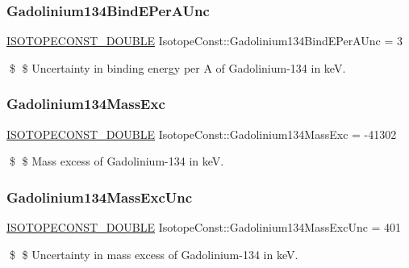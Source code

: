 \subsubsection{\texorpdfstring{Gadolinium134\+Bind\+E\+Per\+A\+Unc}{Gadolinium134BindEPerAUnc}}
{\footnotesize\ttfamily \mbox{\hyperlink{group___isotope_const-_macros_ga8f45a7272ce02c0b4c65c44636ed719a}{I\+S\+O\+T\+O\+P\+E\+C\+O\+N\+S\+T\+\_\+\+D\+O\+U\+B\+LE}} Isotope\+Const\+::\+Gadolinium134\+Bind\+E\+Per\+A\+Unc = 3}

\$ \$ Uncertainty in binding energy per A of Gadolinium-\/134 in keV. \mbox{\label{group___isotope_const-_gadolinium-_gd134_ga61730ce7c763df1f5a186f3af18690cd}} 
\subsubsection{\texorpdfstring{Gadolinium134\+Mass\+Exc}{Gadolinium134MassExc}}
{\footnotesize\ttfamily \mbox{\hyperlink{group___isotope_const-_macros_ga8f45a7272ce02c0b4c65c44636ed719a}{I\+S\+O\+T\+O\+P\+E\+C\+O\+N\+S\+T\+\_\+\+D\+O\+U\+B\+LE}} Isotope\+Const\+::\+Gadolinium134\+Mass\+Exc = -\/41302}

\$ \$ Mass excess of Gadolinium-\/134 in keV. \mbox{\label{group___isotope_const-_gadolinium-_gd134_ga2efe97db2ab39b32526c2e6ad746528d}} 
\subsubsection{\texorpdfstring{Gadolinium134\+Mass\+Exc\+Unc}{Gadolinium134MassExcUnc}}
{\footnotesize\ttfamily \mbox{\hyperlink{group___isotope_const-_macros_ga8f45a7272ce02c0b4c65c44636ed719a}{I\+S\+O\+T\+O\+P\+E\+C\+O\+N\+S\+T\+\_\+\+D\+O\+U\+B\+LE}} Isotope\+Const\+::\+Gadolinium134\+Mass\+Exc\+Unc = 401}

\$ \$ Uncertainty in mass excess of Gadolinium-\/134 in keV. \mbox{\label{group___isotope_const-_gadolinium-_gd134_ga5379653f271ae39943d0c45fb48f7ef8}} 
